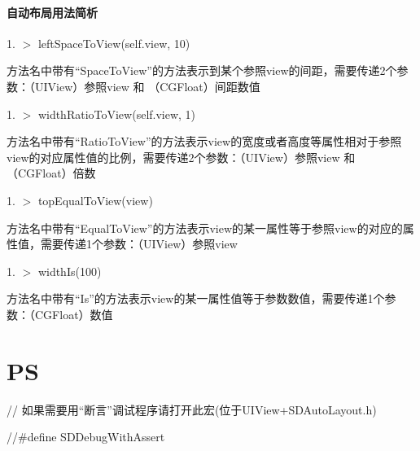 \paragraph*{自动布局用法简析}



1. $>$ left\+Space\+To\+View(self.\+view, 10)

方法名中带有“\+Space\+To\+View”的方法表示到某个参照view的间距，需要传递2个参数：（\+U\+I\+View）参照view 和 （\+C\+G\+Float）间距数值

1. $>$ width\+Ratio\+To\+View(self.\+view, 1)

方法名中带有“\+Ratio\+To\+View”的方法表示view的宽度或者高度等属性相对于参照view的对应属性值的比例，需要传递2个参数：（\+U\+I\+View）参照view 和 （\+C\+G\+Float）倍数

1. $>$ top\+Equal\+To\+View(view)

方法名中带有“\+Equal\+To\+View”的方法表示view的某一属性等于参照view的对应的属性值，需要传递1个参数：（\+U\+I\+View）参照view

1. $>$ width\+Is(100)

方法名中带有“\+Is”的方法表示view的某一属性值等于参数数值，需要传递1个参数：（\+C\+G\+Float）数值

\section*{PS}

// 如果需要用“断言”调试程序请打开此宏(位于\+U\+I\+View+\+S\+D\+Auto\+Layout.h)

//\#define S\+D\+Debug\+With\+Assert

 